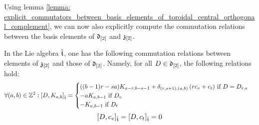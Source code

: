         Using lemma \ref{lemma: explicit_commutators_between_basis_elements_of_toroidal_central_orthogonal_complement}, we can now also explicitly compute the commutation relations between the basis elements of $\mathfrak{d}_{[2]}$ and $\mathfrak{z}_{[2]}$.
        \begin{lemma} \label{lemma: explicit_commutators_between_central_basis_elements_and_derivations}
            In the Lie algebra $\hat{\mathfrak{t}}$, one has the following commutation relations between elements of $\mathfrak{z}_{[2]}$ and those of $\mathfrak{d}_{[2]}$. Namely, for all $D \in \mathfrak{d}_{[2]}$, the following relations hold:
                $$
                    \forall (a, b) \in \mathbb{Z}^2: [D, K_{a, b}]_{\hat{\mathfrak{t}}} =
                    \begin{cases}
                        \text{$((b - 1)r - sa) K_{a - r, b - s - 1} + \delta_{(r, s + 1), (a, b)} \left( r c_v + c_t \right)$ if $D = D_{r, s}$}
                        \\
                        \text{$-a K_{a, b - 1}$ if $D_v$}
                        \\
                        \text{$-K_{a, b - 1}$ if $D_t$}
                    \end{cases}
                $$
                $$[D, c_v]_{\hat{\mathfrak{t}}} = [D, c_t]_{\hat{\mathfrak{t}}} = 0$$
        \end{lemma}
